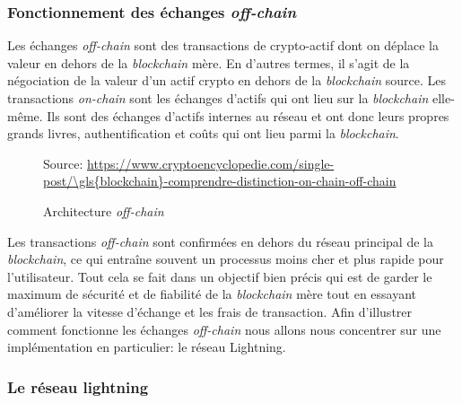 \subsubsection{Fonctionnement des échanges \textit{off-chain}}
Les échanges \textit{off-chain} sont des transactions de crypto-\gls{actif} dont on déplace la valeur en dehors de la \textit{\gls{blockchain}} mère. En d’autres termes, il s’agit de la négociation de la valeur d’un \gls{actif} crypto en dehors de la \textit{\gls{blockchain}} source. Les transactions \textit{on-chain} sont les échanges d'\gls{actif}s qui ont lieu sur la \textit{\gls{blockchain}} elle-même.
Ils sont des échanges d’\gls{actif}s internes au réseau et ont donc leurs propres grands livres, authentification et coûts qui ont lieu parmi la \textit{\gls{blockchain}}.
\begin{figure}[h!]
    \centering
    {\scriptsize Source: \url{https://www.cryptoencyclopedie.com/single-post/\gls{blockchain}-comprendre-distinction-on-chain-off-chain}}
    \caption{Architecture \textit{off-chain}}
    \label{fig:offchain}
\end{figure}
Les transactions \textit{off-chain} sont confirmées en dehors du réseau principal de la \textit{\gls{blockchain}}, ce qui entraîne souvent un processus moins cher et plus rapide pour l’utilisateur. 
Tout cela se fait dans un objectif bien précis qui est de garder le maximum de sécurité et de fiabilité de la \textit{\gls{blockchain}} mère tout en essayant d'améliorer la vitesse d'échange et les frais de transaction.
Afin d'illustrer comment fonctionne les échanges \textit{off-chain} nous allons nous concentrer sur une implémentation en particulier: le réseau Lightning. 

\subsubsection{Le réseau lightning}

